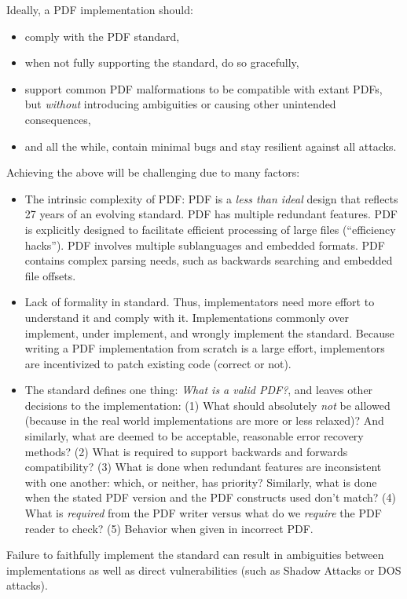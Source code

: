 Ideally, a PDF implementation should:
\begin{itemize}
\item comply with the PDF standard,
\item when not fully supporting the standard, do so gracefully,
\item support common PDF malformations
  to be compatible with extant PDFs, but \emph{without} introducing ambiguities
  or causing other unintended consequences,
\item and all the while, contain minimal bugs and stay resilient
  against all attacks.
\end{itemize}
Achieving the above will be challenging due to many factors:
\begin{itemize}
\item The intrinsic complexity of PDF:
  PDF is a \emph{less than ideal} design that reflects 27 years of
  an evolving standard.
  PDF has multiple redundant features.
  PDF is explicitly designed to facilitate efficient processing of
  large files (``efficiency hacks'').
  PDF involves multiple sublanguages and embedded formats.
  PDF contains complex parsing needs, such as backwards searching and
  embedded file offsets.
\item Lack of formality in standard. Thus, implementators
  need more effort to understand it and comply with it.
  Implementations commonly over implement, under implement,
  and wrongly implement the standard.
  Because writing a PDF implementation from scratch is a large effort,
  implementors are incentivized to patch existing code (correct or not).
\item The standard defines one thing: \emph{What is a valid PDF?},
  and leaves other decisions to the implementation:
  (1) What should absolutely \emph{not} be allowed (because in the real world
    implementations are more or less relaxed)? And similarly,
    what are deemed to be acceptable, reasonable error recovery methods?
  (2) What is required to support backwards and forwards compatibility?
  (3) What is done when redundant features are inconsistent with one
    another: which, or neither, has priority?
    Similarly, what is done when the stated PDF version and the PDF
    constructs used don't match?
  (4) What is \emph{required} from the PDF writer versus
    what do we \emph{require} the PDF reader to check?
  (5) Behavior when given in incorrect PDF.
\end{itemize}
Failure to faithfully implement the standard can result in ambiguities
between implementations as well as direct vulnerabilities (such as
Shadow Attacks or DOS attacks).

